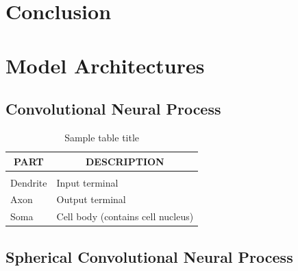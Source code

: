 \documentclass{article} %
\begin{document}
\section{Conclusion}




\appendix
\section{Model Architectures}

\subsection{Convolutional Neural Process}


\begin{table}[t]
    \caption{Sample table title}
    \label{sample-table}
    \begin{center}
        \begin{tabular}{ll}
        \multicolumn{1}{c}{\bf PART}  &\multicolumn{1}{c}{\bf DESCRIPTION}
        \\ \hline \\
        Dendrite         &Input terminal \\
        Axon             &Output terminal \\
        Soma             &Cell body (contains cell nucleus) \\
        \end{tabular}
    \end{center}
\end{table}


\subsection{Spherical Convolutional Neural Process}
\end{document}

